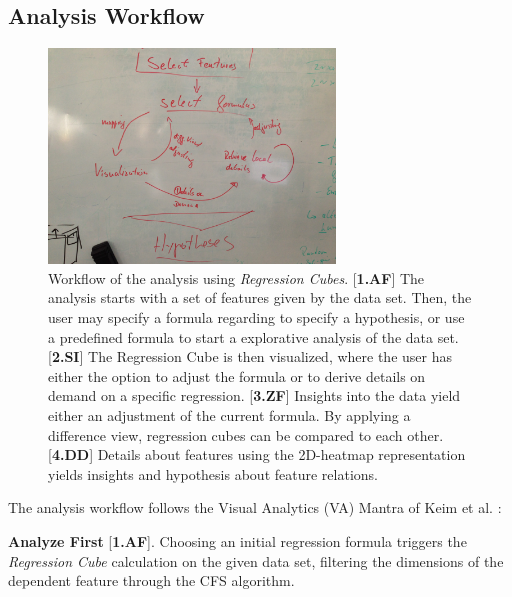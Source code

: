 \documentclass[journal]{style/vgtc} 			          %
\newcommand{\com}[1]{\textcolor{orange}{\uline{#1}}}
\begin{document}
\subsection{Analysis Workflow}
\begin{figure}[htb]
 \centering
 \includegraphics[width=3.0in]{figures/workflow_sketch}
 \caption{
 Workflow of the analysis using \emph{Regression Cubes}.
 [\textbf{1.AF}] The analysis starts with a set of features given by the data set.
 Then, the user may specify a formula regarding to specify a hypothesis, or use a predefined formula to start a explorative analysis of the data set.
 [\textbf{2.SI}] The Regression Cube is then visualized, where the user has either the option to adjust the formula or to derive details on demand on a specific regression.
 [\textbf{3.ZF}] Insights into the data yield either an adjustment of the current formula.
 By applying a difference view, regression cubes can be compared to each other.
 [\textbf{4.DD}] Details about features using the 2D-heatmap representation yields insights and hypothesis about feature relations.
 }
  \label{fig:Workflow}
\end{figure}
The analysis workflow follows the Visual Analytics (VA) Mantra of Keim et al. \cite{Keim}:

\textbf{Analyze First} [\textbf{1.AF}]. Choosing an initial regression formula triggers the \emph{Regression Cube} calculation on the given data set, filtering the dimensions of the dependent feature through the CFS algorithm.
\end{document}
